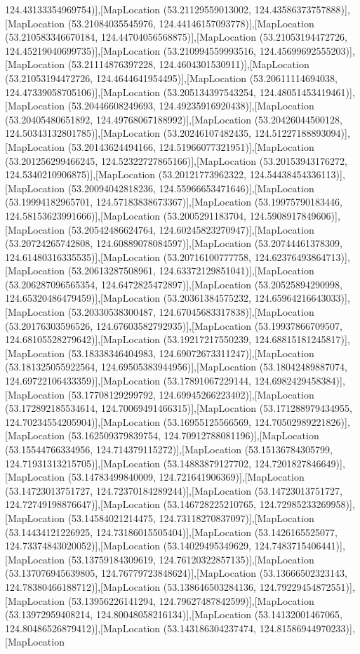 124.43133354969754)],[MapLocation (53.21129559013002, 124.43586373757888)],[MapLocation (53.21084035545976, 124.44146157093778)],[MapLocation (53.210583346670184, 124.44704056568875)],[MapLocation (53.21053194472726, 124.45219040699735)],[MapLocation (53.210994559993516, 124.45699692555203)],[MapLocation (53.21114876397228, 124.4604301530911)],[MapLocation (53.21053194472726, 124.4644641954495)],[MapLocation (53.20611114694038, 124.47339058705106)],[MapLocation (53.205134397543254, 124.48051453419461)],[MapLocation (53.20446608249693, 124.49235916920438)],[MapLocation (53.20405480651892, 124.49768067188992)],[MapLocation (53.20426044500128, 124.50343132801785)],[MapLocation (53.20246107482435, 124.51227188893094)],[MapLocation (53.20143624494166, 124.51966077321951)],[MapLocation (53.201256299466245, 124.52322727865166)],[MapLocation (53.20153943176272, 124.5340210906875)],[MapLocation (53.20121773962322, 124.54438454336113)],[MapLocation (53.20094042818236, 124.55966653471646)],[MapLocation (53.19994182965701, 124.57183838673367)],[MapLocation (53.19975790183446, 124.58153623991666)],[MapLocation (53.2005291183704, 124.5908917849606)],[MapLocation (53.20542486624764, 124.60245823270947)],[MapLocation (53.20724265742808, 124.60889078084597)],[MapLocation (53.20744461378309, 124.61480316335535)],[MapLocation (53.20716100777758, 124.62376493864713)],[MapLocation (53.20613287508961, 124.63372129851041)],[MapLocation (53.206287096565354, 124.6472825472897)],[MapLocation (53.20525894290998, 124.65320486479459)],[MapLocation (53.20361384575232, 124.65964216643033)],[MapLocation (53.20330538300487, 124.67045683317838)],[MapLocation (53.20176303596526, 124.67603582792935)],[MapLocation (53.19937866709507, 124.68105528279642)],[MapLocation (53.19217217550239, 124.68815181245817)],[MapLocation (53.18338346404983, 124.69072673311247)],[MapLocation (53.181325055922564, 124.69505383944956)],[MapLocation (53.18042489887074, 124.69722106433359)],[MapLocation (53.17891067229144, 124.6982429458384)],[MapLocation (53.17708129299792, 124.69945266223402)],[MapLocation (53.172892185534614, 124.70069491466315)],[MapLocation (53.171288979434955, 124.70234554205904)],[MapLocation (53.16955125566569, 124.70502989221826)],[MapLocation (53.162509379839754, 124.70912788081196)],[MapLocation (53.15544766334956, 124.714379115272)],[MapLocation (53.15136784305799, 124.71931313215705)],[MapLocation (53.14883879127702, 124.7201827846649)],[MapLocation (53.14783499840009, 124.721641906369)],[MapLocation (53.14723013751727, 124.72370184289244)],[MapLocation (53.14723013751727, 124.72749198876647)],[MapLocation (53.146728225210765, 124.72985233269958)],[MapLocation (53.14584021214475, 124.73118270837097)],[MapLocation (53.14434121226925, 124.73186015505404)],[MapLocation (53.1426165525077, 124.73374843020052)],[MapLocation (53.14029495349629, 124.7483715406441)],[MapLocation (53.13759184309619, 124.76120322857135)],[MapLocation (53.137076945639805, 124.76779723848624)],[MapLocation (53.13666502323143, 124.78380466188712)],[MapLocation (53.138646503284136, 124.79229454872551)],[MapLocation (53.13956226141294, 124.79627487842599)],[MapLocation (53.13972959408214, 124.80048058216134)],[MapLocation (53.14132001467065, 124.80486526879412)],[MapLocation (53.143186304237474, 124.81586944970233)],[MapLocation 